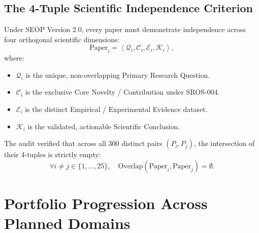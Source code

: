 \documentclass[11pt,letterpaper]{article}
\begin{document}
\subsection{The 4-Tuple Scientific Independence Criterion}
Under SEOP Version 2.0, every paper must demonstrate independence across four orthogonal scientific dimensions:
\begin{equation}
\text{Paper}_i = \left\langle \mathcal{Q}_i, \mathcal{C}_i, \mathcal{E}_i, \mathcal{K}_i \right\rangle,
\end{equation}
where:
\begin{itemize}
    \item $\mathcal{Q}_i$ is the unique, non-overlapping Primary Research Question.
    \item $\mathcal{C}_i$ is the exclusive Core Novelty / Contribution under SROS-004.
    \item $\mathcal{E}_i$ is the distinct Empirical / Experimental Evidence dataset.
    \item $\mathcal{K}_i$ is the validated, actionable Scientific Conclusion.
\end{itemize}

The audit verified that across all 300 distinct pairs $(P_i, P_j)$, the intersection of their 4-tuples is strictly empty:
\begin{equation}
\forall i \ne j \in \{1, \dots, 25\}, \quad \text{Overlap}(\text{Paper}_i, \text{Paper}_j) = \emptyset.
\end{equation}

\section{Portfolio Progression Across Planned Domains}
\end{document}
